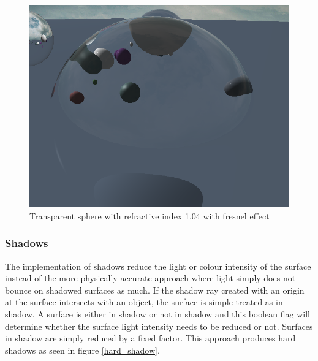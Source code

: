 \documentclass[final]{cmpreport}
\begin{document}
\begin{figure}
    \centering
    \includegraphics[width=\textwidth]{img/fresnel_hollow.png}
    \caption{Transparent sphere with refractive index 1.04 with fresnel effect}
    \label{fresnel_hollow}
\end{figure}

\subsubsection{Shadows}

The implementation of shadows reduce the light or colour intensity of the surface instead of the more physically accurate approach where light simply does not bounce on shadowed surfaces as much. If the shadow ray created with an origin at the surface intersects with an object, the surface is simple treated as in shadow. A surface is either in shadow or not in shadow and this boolean flag will determine whether the surface light intensity needs to be reduced or not. Surfaces in shadow are simply reduced by a fixed factor. This approach produces hard shadows as seen in figure \ref{hard_shadow}.
\end{document}
